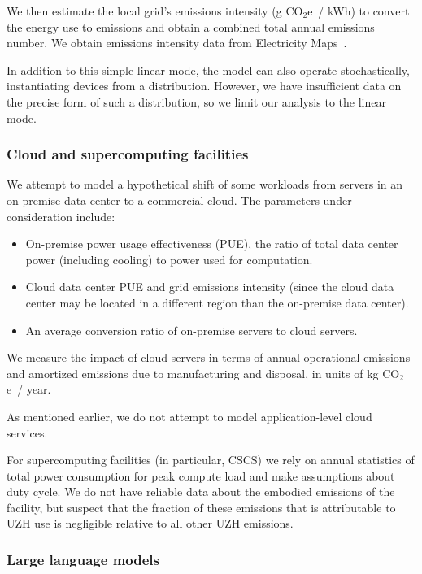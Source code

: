 \documentclass[11pt]{article}
\newcommand{\coe}{CO$_2$e}
\newcommand{\gcoe}{g \coe}
\newcommand{\kgcoe}{k\gcoe}
\newcommand{\gcoekwh}{\gcoe\ / kWh}
\begin{document}
We then estimate the local grid's emissions intensity (\gcoekwh) to convert the energy use to emissions and obtain a combined total annual emissions number. We obtain emissions intensity data from Electricity Maps~\cite{electricitymaps}.

In addition to this simple linear mode, the model can also operate stochastically, instantiating devices from a distribution. However, we have insufficient data on the precise form of such a distribution, so we limit our analysis to the linear mode.

\subsubsection*{Cloud and supercomputing facilities}

We attempt to model a hypothetical shift of some workloads from servers in an on-premise data center to a commercial cloud. The parameters under consideration include:

\begin{itemize}
  \item On-premise power usage effectiveness (PUE), the ratio of total data center power (including cooling) to power used for computation.
  \item Cloud data center PUE and grid emissions intensity (since the cloud data center may be located in a different region than the on-premise data center).
  \item An average conversion ratio of on-premise servers to cloud servers.
\end{itemize}

We measure the impact of cloud servers in terms of annual operational emissions and amortized emissions due to manufacturing and disposal, in units of \kgcoe\ / year.

As mentioned earlier, we do not attempt to model application-level cloud services.

For supercomputing facilities (in particular, CSCS) we rely on annual statistics of total power consumption for peak compute load and make assumptions about duty cycle. We do not have reliable data about the embodied emissions of the facility, but suspect that the fraction of these emissions that is attributable to UZH use is negligible relative to all other UZH emissions.

\subsubsection*{Large language models}
\end{document}
